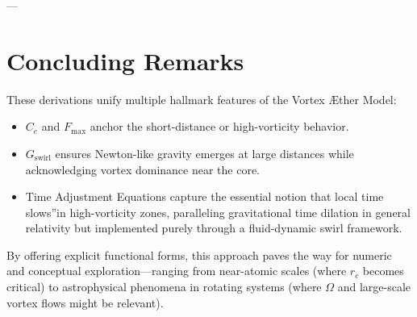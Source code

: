 ---

\section{Concluding Remarks}

These derivations unify multiple hallmark features of the Vortex Æther Model:
\begin{itemize}
    \item \(C_e\) and \(F_{\max}\) anchor the short-distance or high-vorticity behavior.
    \item \(G_\text{swirl}\) ensures Newton-like gravity emerges at large distances while acknowledging vortex dominance near the core.
    \item Time Adjustment Equations capture the essential notion that \grqq local time slows\textquotedblright in high-vorticity zones, paralleling gravitational time dilation in general relativity but implemented purely through a fluid-dynamic swirl framework.
\end{itemize}

By offering explicit functional forms, this approach paves the way for numeric and conceptual exploration—ranging from near-atomic scales (where \(r_c\) becomes critical) to astrophysical phenomena in rotating systems (where \(\Omega\) and large-scale vortex flows might be relevant).